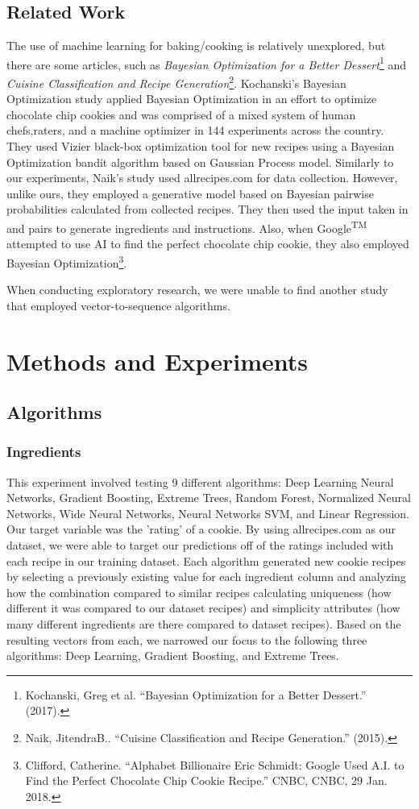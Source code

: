 \documentclass[11pt, a4paper]{article}
\begin{document}
		\subsection*{Related Work}
		The use of machine learning for baking/cooking is relatively unexplored, but there are some articles, such as \textit{Bayesian Optimization for a Better Dessert}\footnote{Kochanski, Greg et al. “Bayesian Optimization for a Better Dessert.” (2017).} and \textit{Cuisine Classification and Recipe Generation}\footnote{Naik, JitendraB.. “Cuisine Classification and Recipe Generation.” (2015).}. Kochanski's Bayesian Optimization study applied Bayesian Optimization in an effort to optimize chocolate chip cookies and was comprised of a mixed system of human chefs,raters, and a machine optimizer in 144 experiments across the country. They used Vizier black-box optimization tool for new recipes using a Bayesian Optimization bandit algorithm based on Gaussian Process model. 
		Similarly to our experiments, Naik's study used allrecipes.com for data collection. However, unlike ours, they employed a generative model based on Bayesian pairwise probabilities calculated from collected recipes. They then used  the  input taken in and pairs to generate ingredients and instructions. Also, when Google\textsuperscript{TM} attempted to use AI to find the perfect chocolate chip cookie, they also employed Bayesian Optimization\footnote{Clifford, Catherine. “Alphabet Billionaire Eric Schmidt: Google Used A.I. to Find the Perfect Chocolate Chip Cookie Recipe.” CNBC, CNBC, 29 Jan. 2018.}.
		
		When conducting exploratory research, we were unable to find another study that employed vector-to-sequence algorithms. 
		
		\section{Methods and Experiments}
		\subsection{Algorithms}
		\subsubsection{Ingredients}
		This experiment involved testing 9 different algorithms: Deep Learning Neural Networks, Gradient Boosting, Extreme Trees, Random Forest, Normalized Neural Networks, Wide Neural Networks, Neural Networks SVM, and Linear Regression. Our target variable was the 'rating' of a cookie. By using allrecipes.com as our dataset, we were able to target our predictions off of the ratings included with each recipe in our training dataset. Each algorithm generated new cookie recipes by selecting a previously existing value for each ingredient column and analyzing how the combination compared to similar recipes calculating uniqueness (how different it was compared to our dataset recipes) and simplicity attributes (how many different ingredients are there compared to dataset recipes). Based on the resulting vectors from each, we narrowed our focus to the following three algorithms: Deep Learning, Gradient Boosting, and Extreme Trees. 
\end{document}
